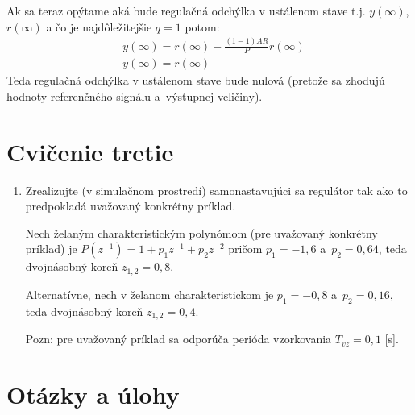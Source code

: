 \documentclass[a4paper, 10pt, ]{article}
\begin{document}
Ak sa teraz opýtame aká bude regulačná odchýlka v ustálenom stave t.j. $y(\infty)$, $r(\infty)$ a čo je najdôležitejšie $q = 1$ potom:
\begin{equation}
	\begin{split}
		& y(\infty) =r(\infty) -  \frac{(1-1)AR}{P}r(\infty)
		\\& y(\infty) =r(\infty)
	\end{split}
\end{equation}
Teda regulačná odchýlka v ustálenom stave bude nulová (pretože sa zhodujú hodnoty referenčného signálu a~výstupnej veličiny).











\section{Cvičenie tretie}
\label{cvictretie}


\begin{enumerate}[leftmargin=0pt, labelsep=4mm, itemsep=0pt]

	\item Zrealizujte (v simulačnom prostredí) samonastavujúci sa regulátor tak ako to predpokladá uvažovaný konkrétny príklad.

	Nech želaným charakteristickým polynómom (pre uvažovaný konkrétny príklad) je $P(z^{-1}) = 1 + p_1z^{-1} + p_2z^{-2}$ pričom $p_1 = -1,6$ a~$p_2 = 0,64$, teda dvojnásobný koreň $z_{1,2} = 0,8$.

	Alternatívne, nech v želanom charakteristickom je $p_1 = -0,8$ a~$p_2 = 0,16$, teda dvojnásobný koreň $z_{1,2} = 0,4$.

	Pozn: pre uvažovaný príklad sa odporúča perióda vzorkovania $T_{vz} = 0,1$ [s].

\end{enumerate}









\section{Otázky a úlohy}
\end{document}
